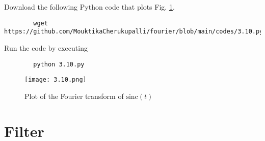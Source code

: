 \documentclass[journal,12pt,twocolumn]{IEEEtran}
\providecommand{\sinc}[1]{\mathrm{sinc}\ensuremath{\left(#1\right)}}
\numberwithin{equation}{section}
\numberwithin{figure}{section}
\renewcommand\thesection{\arabic{section}}
\begin{document}
\begin{enumerate}[label=\thesection.\arabic*,ref=\thesection.\theenumi]
	Download the following Python code that plots Fig. \ref{fig-3.10}.
	\begin{lstlisting}
		wget https://github.com/MouktikaCherukupalli/fourier/blob/main/codes/3.10.py
	\end{lstlisting}
	
	Run the code by executing
	\begin{lstlisting}
		python 3.10.py
	\end{lstlisting}

	\begin{figure}[!ht]
		\centering
		\texttt{[image: 3.10.png]}
		\caption{Plot of the Fourier transform of $\sinc{t}$}
		\label{fig-3.10}	
	\end{figure}
	\end{enumerate}
	
	\section{Filter}
\end{document}
